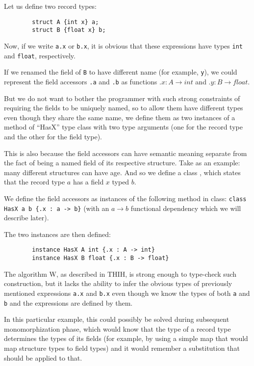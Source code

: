\begin{ex}
    Let us define two record types:

    \begin{lstlisting}
        struct A {int x} a;
        struct B {float x} b;
    \end{lstlisting}

    Now, if we write \lstinline{a.x} or \lstinline{b.x}, it is obvious that these expressions have types \lstinline{int} and \lstinline{float}, respectively.

    If we renamed the field of \lstinline{B} to have different name (for example, \lstinline{y}), we could represent the field accessors \lstinline{.a} and \lstinline{.b} as functions $.x : A \to int$ and $.y : B \to float$.

    But we do not want to bother the programmer with such strong constraints of requiring the fields to be uniquely named, so to allow them have different types even though they share the same name, we define them as two instances of a method of ``HasX'' type class with two type arguments (one for the record type and the other for the field type).

    This is also because the field accessors can have semantic meaning separate from the fact of being a named field of its respective structure. Take  as an example: many different structures can have age. And so we define a class , which states that the record type $a$ has a field $x$ typed $b$.

    We define the field accessors  as instances of the following method in  class: \lstinline|class HasX a b {.x : a -> b}| (with an $a \to b$ functional dependency which we will describe later).

    The two instances are then defined:

    \begin{lstlisting}
        instance HasX A int {.x : A -> int}
        instance HasX B float {.x : B -> float}
    \end{lstlisting}

    The algorithm W, as described in THIH, is strong enough to type-check such construction, but it lacks the ability to infer the obvious types of previously mentioned expressions \lstinline{a.x} and \lstinline{b.x} even though we know the types of both \lstinline{a} and \lstinline{b} and the expressions are defined by them.
\end{ex}


In this particular example, this could possibly be solved during subsequent monomorphization phase, which would know that the type of a record type determines the types of its fields (for example, by using a simple map that would map structure types to field types) and it would remember a substitution that should be applied to that.

